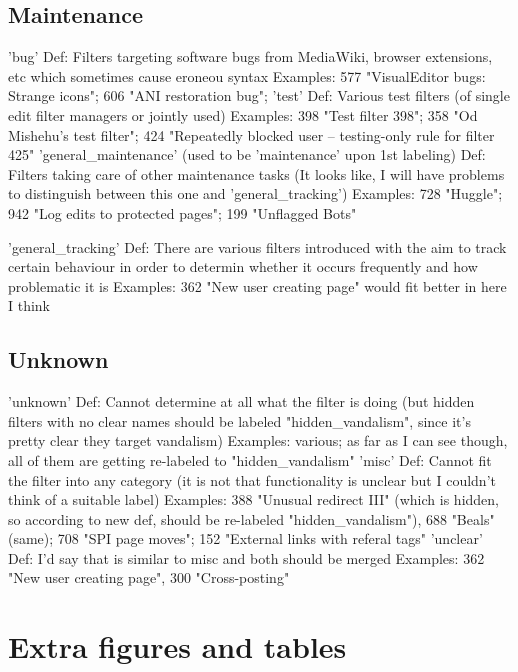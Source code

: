 \subsection{Maintenance}

'bug'
  Def: Filters targeting software bugs from MediaWiki, browser extensions, etc which sometimes cause eroneou syntax
  Examples: 577 "VisualEditor bugs: Strange icons"; 606 "ANI restoration bug";
'test'
  Def: Various test filters (of single edit filter managers or jointly used)
  Examples: 398 "Test filter 398"; 358 "Od Mishehu's test filter"; 424 "Repeatedly blocked user --  testing-only rule for filter 425"
'general\_maintenance' (used to be 'maintenance' upon 1st labeling)
  Def: Filters taking care of other maintenance tasks (It looks like, I will have problems to distinguish between this one and 'general\_tracking')
  Examples: 728 "Huggle"; 942 "Log edits to protected pages"; 199 "Unflagged Bots"

'general\_tracking'
  Def: There are various filters introduced with the aim to track certain behaviour in order to determin whether it occurs frequently and how problematic it is
  Examples: 362 "New user creating page" would fit better in here I think


\subsection{Unknown}

'unknown'
  Def: Cannot determine at all what the filter is doing (but hidden filters with no clear names should be labeled "hidden\_vandalism", since it's pretty clear they target vandalism)
  Examples: various; as far as I can see though, all of them are getting re-labeled to "hidden\_vandalism"
'misc'
  Def: Cannot fit the filter into any category (it is not that functionality is unclear but I couldn't think of a suitable label)
  Examples: 388 "Unusual redirect III" (which is hidden, so according to new def, should be re-labeled "hidden\_vandalism"), 688 "Beals" (same); 708 "SPI page moves"; 152 "External links with referal tags"
'unclear'
  Def: I'd say that is similar to misc and both should be merged
  Examples: 362 "New user creating page", 300 "Cross-posting"


\section{Extra figures and tables}
\label{app:appendix-figures}

